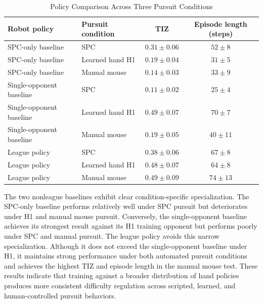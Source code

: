 \documentclass[journal,twoside,web]{ieeecolor2}
\begin{document}
\begin{table}[!t]
\caption{Policy Comparison Across Three Pursuit Conditions}
\label{tab:policy_comparison}
\centering
\renewcommand{\arraystretch}{1.08}
\begin{tabular}{llcc}
\toprule
Robot policy & Pursuit condition & TIZ & Episode length (steps) \\
\midrule
SPC-only baseline & SPC & $0.31\pm0.06$ & $52\pm8$ \\
SPC-only baseline & Learned hand H1 & $0.19\pm0.04$ & $31\pm5$ \\
SPC-only baseline & Manual mouse & $0.14\pm0.03$ & $33\pm9$ \\
Single-opponent baseline & SPC & $0.11\pm0.02$ & $25\pm4$ \\
Single-opponent baseline & Learned hand H1 & $0.49\pm0.07$ & $70\pm7$ \\
Single-opponent baseline & Manual mouse & $0.19\pm0.05$ & $40\pm11$ \\
League policy & SPC & $0.38\pm0.06$ & $67\pm8$ \\
League policy & Learned hand H1 & $0.48\pm0.07$ & $64\pm8$ \\
League policy & Manual mouse & $0.49\pm0.09$ & $74\pm13$ \\
\bottomrule
\end{tabular}
\end{table}
The two nonleague baselines exhibit clear condition-specific specialization. The SPC-only baseline performs relatively well under SPC pursuit but deteriorates under H1 and manual mouse pursuit. Conversely, the single-opponent baseline achieves its strongest result against its H1 training opponent but performs poorly under SPC and manual pursuit. The league policy avoids this narrow specialization. Although it does not exceed the single-opponent baseline under H1, it maintains strong performance under both automated pursuit conditions and achieves the highest TIZ and episode length in the manual mouse test. These results indicate that training against a broader distribution of hand policies produces more consistent difficulty regulation across scripted, learned, and human-controlled pursuit behaviors.
\end{document}
